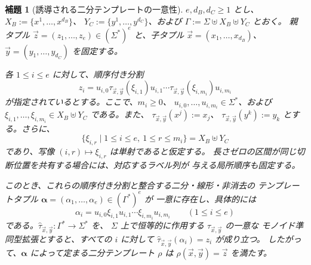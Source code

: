 \documentclass[11pt,a4paper]{ltjsarticle}
\newtheorem{lemma}[theorem]{補題}
\theoremstyle{remark}
\newcommand{\tuple}[1]{\vec{#1}}
\begin{document}
\begin{lemma}[誘導される二分テンプレートの一意性]
\label{lem:unique-induced-template}
\(e,d_B,d_C\ge1\) とし、
\(X_B:=\{x^1,\ldots,x^{d_B}\}\)、
\(Y_C:=\{y^1,\ldots,y^{d_C}\}\)、および
\(\Gamma:=\Sigma\uplus X_B\uplus Y_C\) とおく。
親タプル \(\tuple z=(z_1,\ldots,z_e)\in(\Sigma^*)^e\) と、子タプル
\(\tuple x=(x_1,\ldots,x_{d_B})\)、
\(\tuple y=(y_1,\ldots,y_{d_C})\) を固定する。

各 \(1\le i\le e\) に対して、順序付き分割
\[
  z_i=u_{i,0}\tau_{\tuple x,\tuple y}(\xi_{i,1})u_{i,1}\cdots
      \tau_{\tuple x,\tuple y}(\xi_{i,m_i})u_{i,m_i}
  \tag{1}
\]
が指定されているとする。ここで、\(m_i\ge0\)、
\(u_{i,0},\ldots,u_{i,m_i}\in\Sigma^*\)、および
\(\xi_{i,1},\ldots,\xi_{i,m_i}\in X_B\uplus Y_C\) である。また、
\(\tau_{\tuple x,\tuple y}(x^j):=x_j\)、
\(\tau_{\tuple x,\tuple y}(y^k):=y_k\) とする。さらに、
\[
  \{\xi_{i,r}\mid 1\le i\le e,\ 1\le r\le m_i\}=X_B\uplus Y_C
  \tag{2}
\]
であり、写像 \((i,r)\mapsto\xi_{i,r}\) は単射であると仮定する。
長さゼロの区間が同じ切断位置を共有する場合には、対応するラベル列が
与える局所順序も固定する。

このとき、これらの順序付き分割と整合する二分・線形・非消去の
テンプレートタプル
\(\boldsymbol\alpha=(\alpha_1,\ldots,\alpha_e)\in(\Gamma^*)^e\) が
一意に存在し、具体的には
\[
  \alpha_i=u_{i,0}\xi_{i,1}u_{i,1}\cdots
  \xi_{i,m_i}u_{i,m_i}\qquad(1\le i\le e)
  \tag{3}
\]
である。\(\widehat\tau_{\tuple x,\tuple y}:\Gamma^*\to\Sigma^*\) を、
\(\Sigma\) 上で恒等的に作用する \(\tau_{\tuple x,\tuple y}\) の一意な
モノイド準同型拡張とすると、すべての \(i\) に対して
\(\widehat\tau_{\tuple x,\tuple y}(\alpha_i)=z_i\) が成り立つ。
したがって、\(\boldsymbol\alpha\) によって定まる二分テンプレート \(\rho\) は
\(\rho(\tuple x,\tuple y)=\tuple z\) を満たす。
\end{lemma}
\end{document}
